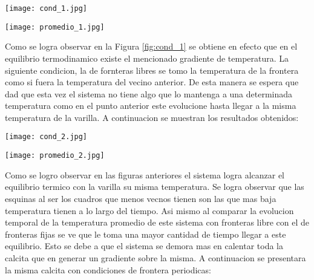 \documentclass[12pt]{article}
\begin{document}
\begin{centering}
\captionsetup{type=figure}
\texttt{[image: cond\_1.jpg]}
\label{fig:cond_1}
\end{centering}


\begin{centering}
\captionsetup{type=figure}
\texttt{[image: promedio\_1.jpg]}
\label{fig:prom_1}
\end{centering}

\noindent Como se logra observar en la Figura \ref{fig:cond_1} se obtiene en efecto que en el equilibrio termodinamico existe el mencionado gradiente de temperatura. La siguiente condicion, la de fornteras libres se tomo  la temperatura de la frontera como si fuera la temperatura del vecino anterior. De esta manera se espera que dad que esta vez el sistema no tiene algo que lo mantenga a una determinada temperatura como en el punto anterior este evolucione hasta llegar a la misma temperatura de la varilla. A continuacion se muestran los resultados obtenidos:

\begin{centering}
\captionsetup{type=figure}
\texttt{[image: cond\_2.jpg]}
\label{fig:cond_2}
\end{centering}


\begin{centering}
\captionsetup{type=figure}
\texttt{[image: promedio\_2.jpg]}
\label{fig:prom_2}
\end{centering}

\noindent Como se logro observar en las figuras anteriores el sistema logra alcanzar el equilibrio termico con la varilla su misma temperatura. Se logra observar que las esquinas al ser los cuadros que menos vecnos tienen son las que mas baja temperatura tienen a lo largo del tiempo. Asi mismo al comparar la evolucion temporal de la temperatura promedio de este sistema con fronteras libre con el de fronteras fijas se ve que le toma una mayor cantidad de tiempo llegar a este equilibrio. Esto se debe a que el sistema se demora mas en calentar toda la calcita que en generar un gradiente sobre la misma. A continuacion se presentara la misma calcita con condiciones de frontera periodicas:
\end{document}
